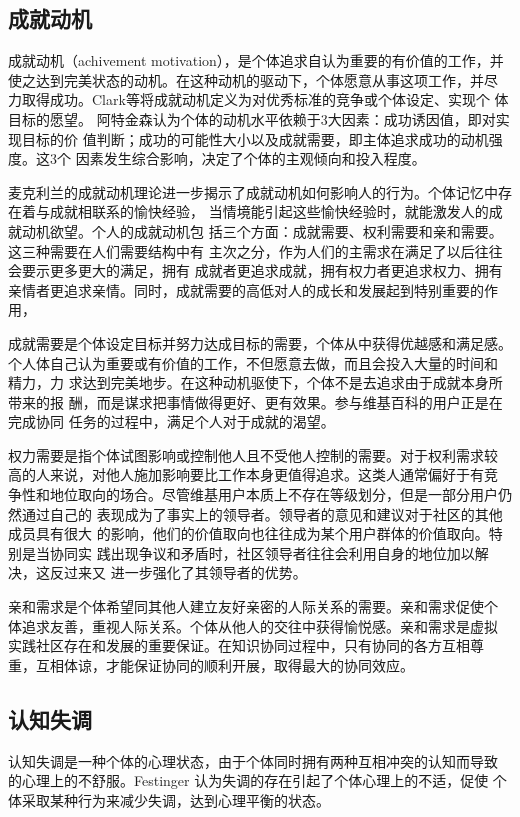 \subsection{成就动机}
\label{sec:achievement}
成就动机（achivement motivation），是个体追求自认为重要的有价值的工作，并
使之达到完美状态的动机。在这种动机的驱动下，个体愿意从事这项工作，并尽
力取得成功。Clark等将成就动机定义为对优秀标准的竞争或个体设定、实现个
体目标的愿望。
阿特金森认为个体的动机水平依赖于3大因素：成功诱因值，即对实现目标的价
值判断；成功的可能性大小以及成就需要，即主体追求成功的动机强度。这3个
因素发生综合影响，决定了个体的主观倾向和投入程度。

麦克利兰的成就动机理论进一步揭示了成就动机如何影响人的行为。个体记忆中存在着与成就相联系的愉快经验，
当情境能引起这些愉快经验时，就能激发人的成就动机欲望。个人的成就动机包
括三个方面：成就需要、权利需要和亲和需要。这三种需要在人们需要结构中有
主次之分，作为人们的主需求在满足了以后往往会要示更多更大的满足，拥有
成就者更追求成就，拥有权力者更追求权力、拥有亲情者更追求亲情。同时，成就需要的高低对人的成长和发展起到特别重要的作用，

成就需要是个体设定目标并努力达成目标的需要，个体从中获得优越感和满足感。
个人体自己认为重要或有价值的工作，不但愿意去做，而且会投入大量的时间和
精力，力
求达到完美地步。在这种动机驱使下，个体不是去追求由于成就本身所带来的报
酬，而是谋求把事情做得更好、更有效果。参与维基百科的用户正是在完成协同
任务的过程中，满足个人对于成就的渴望。

权力需要是指个体试图影响或控制他人且不受他人控制的需要。对于权利需求较
高的人来说，对他人施加影响要比工作本身更值得追求。这类人通常偏好于有竞
争性和地位取向的场合。尽管维基用户本质上不存在等级划分，但是一部分用户仍然通过自己的
表现成为了事实上的领导者。领导者的意见和建议对于社区的其他成员具有很大
的影响，他们的价值取向也往往成为某个用户群体的价值取向。特别是当协同实
践出现争议和矛盾时，社区领导者往往会利用自身的地位加以解决，这反过来又
进一步强化了其领导者的优势。

亲和需求是个体希望同其他人建立友好亲密的人际关系的需要。亲和需求促使个
体追求友善，重视人际关系。个体从他人的交往中获得愉悦感。亲和需求是虚拟
实践社区存在和发展的重要保证。在知识协同过程中，只有协同的各方互相尊
重，互相体谅，才能保证协同的顺利开展，取得最大的协同效应。

\subsection{认知失调}
\label{sec:cognitive-dissonance}
认知失调是一种个体的心理状态，由于个体同时拥有两种互相冲突的认知而导致
的心理上的不舒服。Festinger 认为失调的存在引起了个体心理上的不适，促使
个体采取某种行为来减少失调，达到心理平衡的状态。

